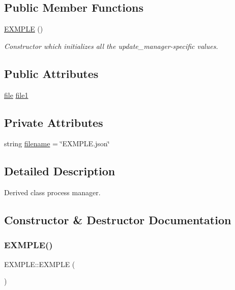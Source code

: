 \subsection*{Public Member Functions}
\begin{DoxyCompactItemize}
\item 
\hyperlink{classEXMPLE_a5969fa4c73afad1ed1a1d82b88117f80}{E\+X\+M\+P\+LE} ()
\begin{DoxyCompactList}\small\item\em Constructor which initializes all the update\+\_\+manager-\/specific values. \end{DoxyCompactList}\end{DoxyCompactItemize}
\subsection*{Public Attributes}
\begin{DoxyCompactItemize}
\item 
\hyperlink{classfile}{file} \hyperlink{classEXMPLE_a2d5be0ecf649d40719d2c94cd683fe3f}{file1}
\end{DoxyCompactItemize}
\subsection*{Private Attributes}
\begin{DoxyCompactItemize}
\item 
string \hyperlink{classEXMPLE_a32f76326cf2b42a51b023b090f210289}{filename} = \char`\"{}E\+X\+M\+P\+L\+E.\+json\char`\"{}
\end{DoxyCompactItemize}


\subsection{Detailed Description}
Derived class process manager. 

\subsection{Constructor \& Destructor Documentation}
\mbox{\label{classEXMPLE_a5969fa4c73afad1ed1a1d82b88117f80}} 
\subsubsection{\texorpdfstring{E\+X\+M\+P\+L\+E()}{EXMPLE()}}
{\footnotesize\ttfamily E\+X\+M\+P\+L\+E\+::\+E\+X\+M\+P\+LE (\begin{DoxyParamCaption}{ }\end{DoxyParamCaption})}



